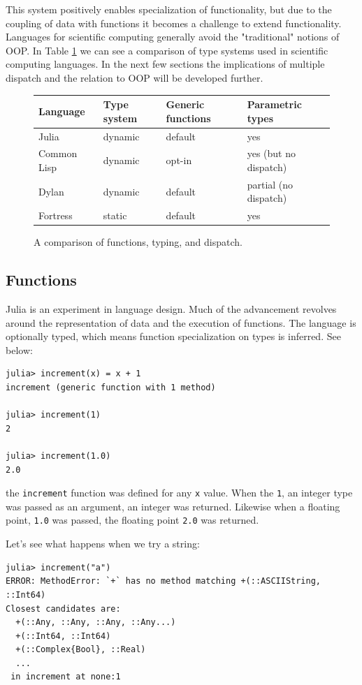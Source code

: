 \documentclass[a4paper]{article}
\begin{document}
This system positively enables specialization of functionality, but due
to the coupling of data with functions it becomes a challenge to extend
functionality. Languages for scientific computing generally avoid the
"traditional" notions
of OOP. In Table \ref{tab:types} we can see a
comparison of type systems used in scientific computing languages. In the next
few sections the implications of multiple dispatch and the relation to OOP
will be developed further.


\begin{figure}[h!]
  \centering
    \caption{A comparison of functions, typing, and dispatch.}
    \begin{tabular}{ l | l l l}
    Language & Type system & Generic functions & Parametric types \\
    \hline
    Julia & dynamic & default & yes \\
    Common Lisp & dynamic & opt-in & yes (but no dispatch) \\
    Dylan & dynamic & default & partial (no dispatch) \\
    Fortress & static & default & yes \\
    \end{tabular}
  \label{tab:types}
\end{figure}


\subsection{Functions}
Julia is an experiment in language design. Much of the advancement
revolves around the representation of data and the execution of functions.
The language is optionally typed, which means function specialization on types
is inferred. See below:
\begin{lstlisting}
julia> increment(x) = x + 1
increment (generic function with 1 method)

julia> increment(1)
2

julia> increment(1.0)
2.0
\end{lstlisting}
the \texttt{increment} function was defined for any \texttt{x} value. When the
\texttt{1}, an
integer type was passed as an argument, an integer was returned. Likewise
when a floating point, \texttt{1.0} was passed, the floating point
\texttt{2.0} was returned.

Let's see what happens when we try a string:
\begin{lstlisting}
julia> increment("a")
ERROR: MethodError: `+` has no method matching +(::ASCIIString, ::Int64)
Closest candidates are:
  +(::Any, ::Any, ::Any, ::Any...)
  +(::Int64, ::Int64)
  +(::Complex{Bool}, ::Real)
  ...
 in increment at none:1
\end{lstlisting}
\end{document}
